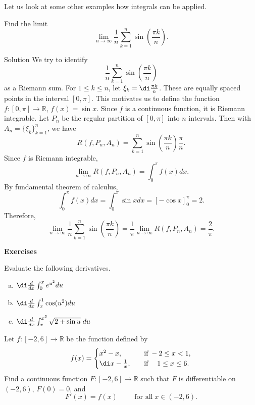 \begin{example}[label=20230527]{}
Let us look at some other examples how integrals can be applied.  
\begin{example}{}
Find the limit 
\[\lim_{n\to\infty}\frac{1}{n}\sum_{k=1}^n\sin\left(\frac{\pi k}{n}\right).\]
\end{example}
\begin{solution}{Solution}
We try to identify \[\frac{1}{n}\sum_{k=1}^n\sin\left(\frac{\pi k}{n}\right)\] as a Riemann sum. For $1\leq k\leq n$, let $\xi_k=\di\frac{\pi k}{n}$.  These are equally spaced points in the interval $[0, \pi]$. This motivates us to define the function $f:[0,\pi]\to\mathbb{R}$, $f(x)=\sin x$. Since $f$ is a continuous function, it is Riemann integrable. Let $P_n$ be the regular partition of $[0,\pi]$ into $n$ intervals. Then with $A_n=\{\xi_k\}_{k=1}^n$, we have
\[R(f,P_n,A_n)=\sum_{k=1}^n\sin \left(\frac{\pi k}{n}\right)\frac{\pi }{n}.\]Since $f$ is Riemann integrable,
\[\lim_{n\to\infty}R(f, P_n, A_n)=\int_0^{\pi}f(x)dx.\]
By fundamental theorem of calculus,
\[\int_0^{\pi}f(x)dx=\int_0^{\pi}\sin xdx=\left[-\cos x\right]_0^{\pi}=2.\]
Therefore,
\[\lim_{n\to\infty}\frac{1}{n}\sum_{k=1}^n\sin\left(\frac{\pi k}{n}\right)=\frac{1}{\pi} \lim_{n\to\infty}R(f, P_n, A_n)=\frac{2}{\pi}.\]
\end{solution}
\vp
\noindent
{\bf \large Exercises  \thesection}
\setcounter{myquestion}{1}

 \begin{question}{\themyquestion}
Evaluate the following derivatives.
\begin{enumerate}[(a)]
\item
$\di\frac{d}{dx}\int_0^xe^{u^2}du$
\item
$\di\frac{d}{dx}\int_x^{1}\cos(u^2)du$
\item
$\di\frac{d}{dx}\int_x^{x^3}\sqrt{2+\sin u}\;du$
\end{enumerate}
\end{question}
\atc

 \begin{question}{\themyquestion}
Let $f:[-2, 6]\to\mathbb{R}$ be the function defined by
\[f(x)=\begin{cases} x^2-x,\quad & \text{if}\; -2\leq x<1,\\ \di x-\frac{1}{x},\quad &\text{if}\;\quad 1\leq x\leq 6.\end{cases} \]
Find a continuous function $F:[-2,6]\to\mathbb{R}$ such that $F$ is differentiable on $(-2,6)$, $F(0)=0$, and 
\[F'(x)=f(x)\hspace{1cm}\text{for all}\;x\in (-2,6).\]


\end{question}
\end{example}
